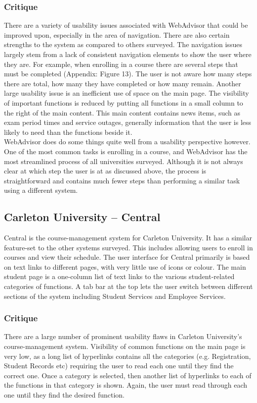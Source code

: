\documentclass[10pt]{article}
\begin{document}
\begin{multicols}{2}
\subsubsection*{Critique}
There are a variety of usability issues associated with \mbox{WebAdvisor} that 
could be improved upon, especially in the area of navigation. There are also 
certain strengths to the system as compared to others surveyed. The navigation 
issues largely stem from a lack of consistent navigation elements to show the 
user where they are. For example, when enrolling in a course there are several 
steps that must be completed (Appendix: Figure 13). The user is not aware how many steps there are total, how many they 
have completed or how many remain. Another large usability issue is an 
inefficient use of space on the main page. The visibility of important functions 
is reduced by putting all functions in a small column to the right of the main 
content. This main content contains news items, such as exam period times and 
service outages, generally information that the user is less likely to need than 
the functions beside it.\\

WebAdvisor does do some things quite well from a usability perspective however. 
One of the most common tasks is enrolling in a course, and WebAdvisor has the 
most streamlined process of all universities surveyed. Although it is not always 
clear at which step the user is at as discussed above, the process is 
straightforward and contains much fewer steps than performing a similar task 
using a different system.

\subsection*{Carleton University -- Central}
Central is the course-management system for Carleton University. It has a 
similar feature-set to the other systems surveyed. This includes allowing users 
to enroll in courses and view their schedule. The user interface for Central 
primarily is based on text links to different pages, with very little use of 
icons or colour. The main student page is a one-column list of text links to the 
various student-related categories of functions. A tab bar at the top lets the 
user switch between different sections of the system including Student Services 
and Employee Services.

\subsubsection*{Critique}
There are a large number of prominent usability flaws in Carleton University's 
course-management system. Visibility of common functions on the main 
page is very low, as a long list of hyperlinks contains all the categories (e.g. 
Registration, Student Records etc) requiring the user to read each one until 
they find the correct one. Once a category is selected, then another list of 
hyperlinks to each of the functions in that category is shown. 
Again, the user must read through each one until they find the desired function.\\


\end{multicols}
\end{document}
